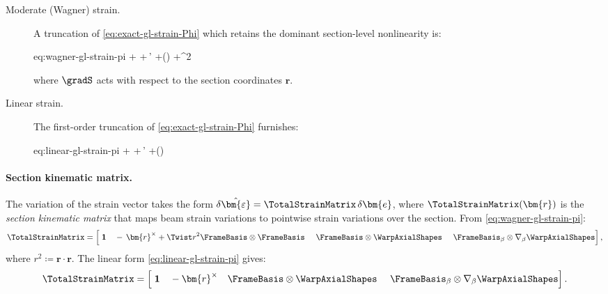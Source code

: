 \begin{description}
\item[Moderate (Wagner) strain.]
A truncation of \eqref{eq:exact-gl-strain-Phi} which retains the dominant section-level nonlinearity is:
\begin{SaveEquation}{eq:wagner-gl-strain-pi}
%
\hat{\StrainVector}\coloneq
\bm{\gamma}
+\bm{\kappa}\times{}
+\FrameBasis\otimes\WarpAxialShapes\,\bm{\alpha}'
+\gradS (\WarpAxialShapes\cdot\bm{\alpha})
+\Twist^2\,
\cdot{}\,\FrameBasis
\end{SaveEquation}
where \(\gradS\) acts with respect to the section coordinates \(\bm{r}\). 

\item[Linear strain.]
The first-order truncation of \eqref{eq:exact-gl-strain-Phi} furnishes:
\begin{SaveEquation}{eq:linear-gl-strain-pi}
\hat{\StrainVector}\coloneq
\bm{\gamma}
+\bm{\kappa}\times{}
+\FrameBasis\otimes\WarpAxialShapes\,\bm{\alpha}'
+\gradS (\WarpAxialShapes\cdot\bm{\alpha})
\end{SaveEquation}
\end{description}

\paragraph{Section kinematic matrix.}
The variation of the strain vector takes the form 
\(\delta\hat{\bm{\varepsilon}} = \TotalStrainMatrix\,\delta\bm{e}\),
where \(\TotalStrainMatrix(\bm{r})\) is the \emph{section kinematic matrix} 
that maps beam strain variations to pointwise strain variations over the section.
From \eqref{eq:wagner-gl-strain-pi}:
\begin{equation}
\TotalStrainMatrix
=\left[
\;\mathbf{1}
~~~-\,\bm{r}^{\times}+\Twist r^2 \FrameBasis\otimes\FrameBasis
~~~~\FrameBasis\otimes\WarpAxialShapes
~~~~\FrameBasis_{\beta}\otimes\nabla_{\beta}\WarpAxialShapes
\right],
\label{eq:def-section-kinematic-matrix-wagner}
\end{equation}
where \(r^2 \coloneq \bm{r}\cdot\bm{r}\).
The linear form \eqref{eq:linear-gl-strain-pi} gives:
\begin{equation}
\TotalStrainMatrix
=\left[
\;\mathbf{1}
~~~-\bm{r}^{\times}
~~~\FrameBasis\otimes\WarpAxialShapes
~~~~\FrameBasis_{\beta}\otimes\nabla_{\beta}\WarpAxialShapes
\right].
\label{eq:def-section-kinematic-matrix-Phi}
\end{equation}

